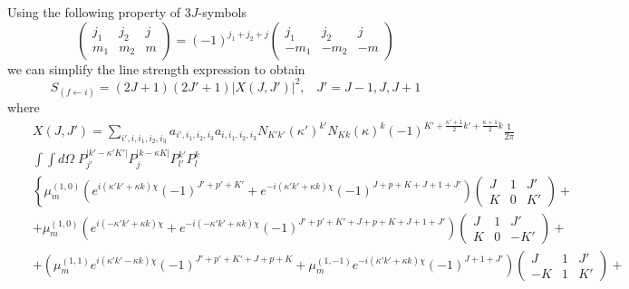 Using the following property of $3J$-symbols
\begin{equation}
\left( \begin{array}{ccc} 
 j_1 & j_2 & j \\
 m_1 & m_2 & m  \end{array} \right) = (-1)^{j_1+j_2+j}
\left( \begin{array}{ccc} 
 j_1 &  j_2 &  j \\
-m_1 & -m_2 & -m  \end{array} \right) 
\end{equation}
we can simplify the line strength expression to obtain
\begin{equation}
S_{(f \leftarrow i)} = (2J+1)(2J'+1) \vert X(J,J') \vert^2, \;\;\; J' = J-1, J, J+1
\end{equation}
where 
\begin{eqnarray} \nonumber &&
X(J,J') = 
\sum_{i',i,i_1,i_2,i_3} a_{i',i_1,i_2,i_3} a_{i,i_1,i_2,i_3} N_{K'k'} (\kappa')^{k'} N_{Kk} (\kappa)^{k} 
(-1)^{K' + \frac{\kappa' +1}{2} k' + \frac{\kappa +1}{2} k } \frac{1}{2 \pi}
\\ \nonumber &&
\int \int d\Omega \; P^{\vert k' - \kappa' K' \vert}_{j'} P^{\vert k - \kappa K \vert}_{j} 
P^{k'}_{l'}  P^{k}_{l}
\\ \nonumber &&
\left\{ \mu^{(1,0)}_m
\left(  e^{ i( \kappa' k'+ \kappa k) \chi  } (-1)^{J'+p'+K'} + 
        e^{-i( \kappa' k'+ \kappa k) \chi  } (-1)^{J +p +K +J + 1 +J'}  \right)
\left( \begin{array}{ccc} 
 J &  1 &  J' \\
 K &  0 &  K'  \end{array} \right) \right. +
\\ \nonumber &&
+ \mu^{(1,0)}_m 
  \left(  e^{ i(-\kappa' k'+ \kappa k) \chi  } + 
          e^{-i(-\kappa' k'+ \kappa k) \chi  } (-1)^{J'+p'+K'+ J +p +K +J + 1 +J'}  \right)
\left( \begin{array}{ccc} 
 J &  1 &  J' \\
 K &  0 & -K'  \end{array} \right) +
\\ \nonumber &&
+ \left(  \mu^{(1, 1)}_m  e^{ i( \kappa' k'- \kappa k) \chi  } (-1)^{J'+p'+K' + J +p +K} + 
          \mu^{(1,-1)}_m  e^{-i( \kappa' k'+ \kappa k) \chi  } (-1)^{J+ 1 +J'}  \right)
\left( \begin{array}{ccc} 
 J &  1 &  J' \\
-K &  1 &  K'  \end{array} \right) +
\\ \nonumber &&

\end{eqnarray}
